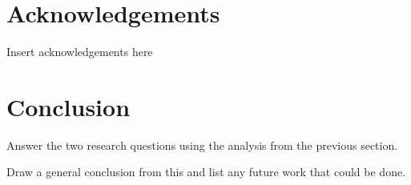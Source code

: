 \documentclass[12pt,a4paper]{article}
\begin{document}

\pagebreak

\pagebreak

\pagebreak

\begin{abstract}
\end{abstract}
\pagebreak

\tableofcontents
\newpage

\listoffigures
\newpage

\renewcommand\lstlistlistingname{List of Listings}
\lstlistoflistings{}
\newpage

\listoftables
\newpage

\section*{Acknowledgements}
Insert acknowledgements here
\subsection*{}
\newpage









\section{Conclusion}

Answer the two research questions using the analysis from the previous section.

Draw a general conclusion from this and list any future work that could be done.

\setlength{\bibitemsep}{0.5\baselineskip}




\pagebreak

\end{document}
